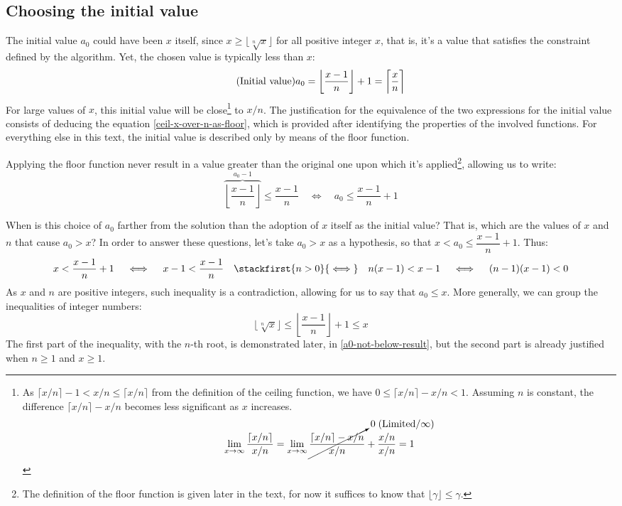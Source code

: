 \subsection*{Choosing the initial value}

The initial value $a_0$ could have been $x$ itself,
since $x \ge \lfloor \sqrt[n]{x} \rfloor$
for all positive integer $x$,
that is, it's a value that satisfies
the constraint defined by the algorithm.
Yet, the chosen value is typically less than $x$:
\[\tag{Initial value}
  a_0 = \left\lfloor \dfrac{x - 1}{n} \right\rfloor + 1
      = \left\lceil \dfrac{x\vphantom{l}}{n} \right\rceil
\]
For large values of $x$, this initial value will be close\footnote{
  As $\lceil x/n \rceil - 1 < x/n \le \lceil x/n \rceil$
  from the definition of the ceiling function,
  we have $0 \le \lceil x/n \rceil - x/n < 1$.
  Assuming $n$ is constant, the difference $\lceil x/n \rceil - x/n$
  becomes less significant as $x$ increases.
  \[
    \lim_{x\to\infty} \dfrac{\lceil x/n \rceil}{x/n}
    =
    \lim_{x\to\infty} \cancelto{0\;(\text{Limited}/\infty)}{
                        \dfrac{\lceil x/n \rceil - x/n}{x/n}
                      } +
                      \dfrac{x/n}{x/n}
    = 1
  \]
}
to $x/n$.
The justification for the equivalence
of the two expressions for the initial value
consists of deducing the equation \eqref{ceil-x-over-n-as-floor},
which is provided after identifying the properties
of the involved functions.
For everything else in this text,
the initial value is described only by means of the floor function.

Applying the floor function
never result in a value greater than the original one
upon which it's applied\footnote{
  The definition of the floor function is given later in the text,
  for now it suffices to know that $\lfloor \gamma \rfloor \le \gamma$.
},
allowing us to write:
\[
  \overbrace{\left\lfloor \dfrac{x - 1}{n} \right\rfloor}^{a_0 - 1}
  \le \dfrac{x - 1}{n}
  \quad\iff\quad
  a_0 \le \dfrac{x - 1}{n} + 1
\]

When is this choice of $a_0$
farther from the solution
than the adoption of $x$ itself as the initial value?
That is, which are the values of $x$ and $n$
that cause $a_0 > x$?
In order to answer these questions,
let's take $a_0 > x$ as a hypothesis,
so that $x < a_0 \le \dfrac{x - 1}{n} + 1$.
Thus:
\[
  x < \dfrac{x - 1}{n} + 1
  \quad\iff\quad
  x - 1 < \dfrac{x - 1}{n}
  \quad\stackfirst{n > 0}{\iff}\quad
  n(x - 1) < x - 1
  \quad\iff\quad
  (n - 1)(x - 1) < 0
\]
As $x$ and $n$ are positive integers,
such inequality is a contradiction,
allowing for us to say that $a_0 \le x$.
More generally,
we can group the inequalities of integer numbers:
\begin{equation}\label{a0-between-result-and-x}
  \lfloor \sqrt[n]{x} \rfloor
  \le
  \left\lfloor \dfrac{x - 1}{n} \right\rfloor + 1
  \le
  x
\end{equation}
The first part of the inequality, with the $n$-th root,
is demonstrated later, in \eqref{a0-not-below-result},
but the second part is already justified when $n \ge 1$ and $x \ge 1$.
